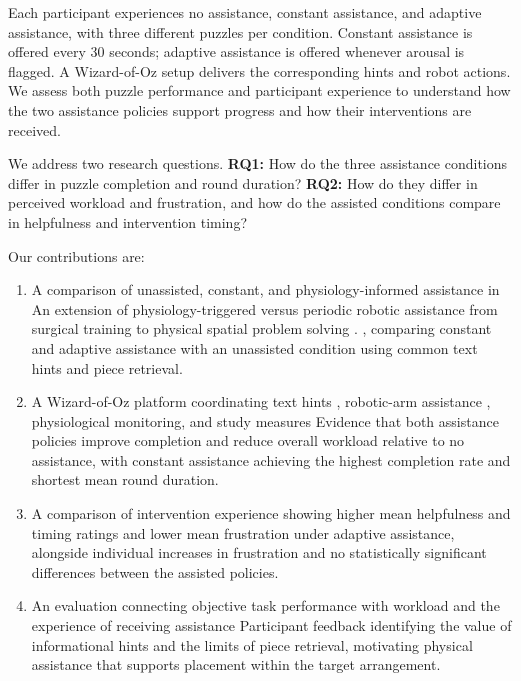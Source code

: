 \documentclass[sigconf,anonymous,balance=false]{aamas}
\providecommand{\DIFadd}[1]{{\protect\color{blue} \sf #1}} %
\providecommand{\DIFdel}[1]{{\protect\color{red} \scriptsize #1}} %
\providecommand{\DIFaddbegin}{} %
\providecommand{\DIFaddend}{} %
\providecommand{\DIFdelbegin}{} %
\providecommand{\DIFdelend}{} %
\begin{document}
Each participant experiences no assistance, constant assistance, and adaptive assistance, with three different puzzles per condition. Constant assistance is offered every 30 seconds; adaptive assistance is offered whenever arousal is flagged. A Wizard-of-Oz setup delivers the corresponding hints and robot actions. We assess both puzzle performance and participant experience to understand how the two assistance policies support progress and how their interventions are received.

We address two research questions. \textbf{RQ1:} How do the three assistance conditions differ in puzzle completion and round duration? \textbf{RQ2:} How do they differ in perceived workload and frustration, and how do the assisted conditions compare in helpfulness and intervention timing?

Our contributions are:

\begin{enumerate}
\item \DIFdelbegin \DIFdel{A comparison of unassisted, constant, and physiology-informed assistance in }\DIFdelend \DIFaddbegin \DIFadd{An extension of physiology-triggered versus periodic robotic assistance from surgical training to }\DIFaddend physical spatial problem solving\DIFdelbegin \DIFdel{.
}\DIFdelend \DIFaddbegin \DIFadd{, comparing constant and adaptive assistance with an unassisted condition using common text hints and piece retrieval.
}\DIFaddend \item \DIFdelbegin \DIFdel{A Wizard-of-Oz platform coordinating text hints , robotic-arm assistance , physiological monitoring, and study measures}\DIFdelend \DIFaddbegin \DIFadd{Evidence that both assistance policies improve completion and reduce overall workload relative to no assistance, with constant assistance achieving the highest completion rate and shortest mean round duration.
}\item \DIFadd{A comparison of intervention experience showing higher mean helpfulness and timing ratings and lower mean frustration under adaptive assistance, alongside individual increases in frustration and no statistically significant differences between the assisted policies}\DIFaddend .
\item \DIFdelbegin \DIFdel{An evaluation connecting objective task performance with workload and the experience of receiving assistance }\DIFdelend \DIFaddbegin \DIFadd{Participant feedback identifying the value of informational hints and the limits of piece retrieval, motivating physical assistance that supports placement within the target arrangement}\DIFaddend .
\end{enumerate}
\end{document}
